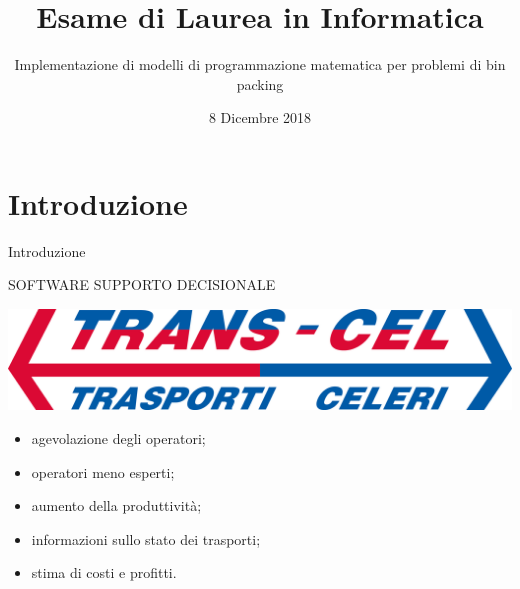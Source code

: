 \documentclass{beamer}
\title{Esame di Laurea in Informatica}
\subtitle{Implementazione di modelli di programmazione matematica per problemi di bin packing}
\author[Daniel Rossi]{%
	\usebox{\authbox}
}
\date{8 Dicembre 2018}
\begin{document}
\maketitle


\section{Introduzione}

\begin{frame}{Introduzione}
	\begin{minipage}[c]{0.45\textwidth}
		\large{\uppercase{Software supporto decisionale}}
	\end{minipage}
	\hfill
	\begin{minipage}[c]{0.45\textwidth}
		\includegraphics[width=1\linewidth]{figures/logo-transcel}
	\end{minipage}
	\vspace{1.0em}
	\begin{itemize}
		\item agevolazione degli operatori;
		\item operatori meno esperti;
		\item aumento della produttivit\`a;
		\item informazioni sullo stato dei trasporti;
		\item stima di costi e profitti.
	\end{itemize}
\end{frame}
\end{document}
